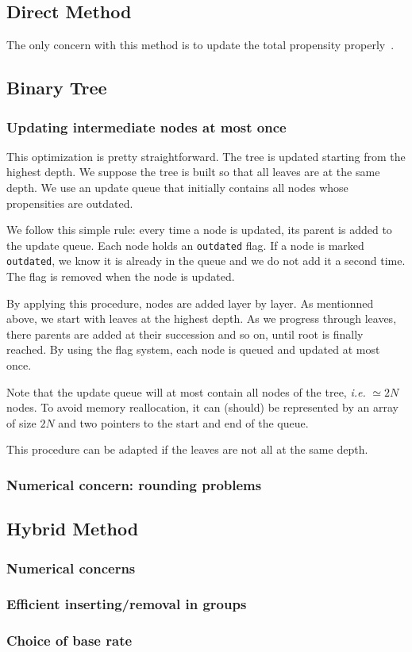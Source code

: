 \subsection{Direct Method}
The only concern with this method is to update the total propensity properly~.

\subsection{Binary Tree}

\subsubsection{Updating intermediate nodes at most once}
This optimization is pretty straightforward. The tree is updated starting from the highest depth. We suppose the tree is built so that all leaves are at the same depth. We use an update queue that initially contains all nodes whose propensities are outdated. 

We follow this simple rule: every time a node is updated, its parent is added to the update queue. Each node holds an \texttt{outdated} flag. If a node is marked \texttt{outdated}, we know it is already in the queue and we do not add it a second time. The flag is removed when the node is updated. 

By applying this procedure, nodes are added layer by layer. As mentionned above, we start with leaves at the highest depth. As we progress through leaves, there parents are added at their succession and so on, until root is finally reached. By using the flag system, each node is queued and updated at most once.

Note that the update queue will at most contain all nodes of the tree, \textit{i.e.} $\simeq 2N$ nodes. To avoid memory reallocation, it can (should) be represented by an array of size $2N$ and two pointers to the start and end of the queue. 

This procedure can be adapted if the leaves are not all at the same depth.

\subsubsection{Numerical concern: rounding problems}

\subsection{Hybrid Method}

\subsubsection{Numerical concerns}

\subsubsection{Efficient inserting/removal in groups}

\subsubsection{Choice of base rate}

